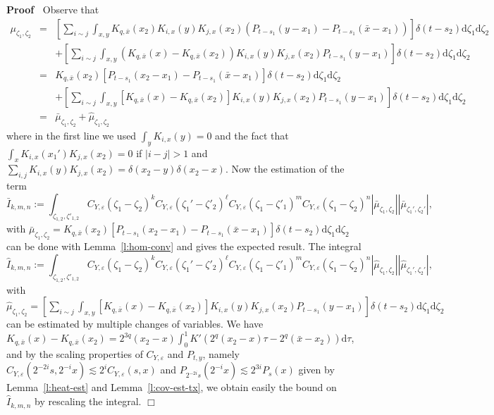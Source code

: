 \documentclass[a4paper,11pt]{article}
\newcommand{\assign}{:=}
\newcommand{\mathd}{\mathrm{d}}
\newenvironment{proof}{\noindent\textbf{Proof\ }}{\hspace*{\fill}$\Box$\medskip}
\begin{document}
\begin{proof}
  Observe that
  \begin{eqnarray*}
    \mu_{\zeta_1, \zeta_2} & = & [\sum_{i \sim j} \int_{x, y} K_{q, \bar{x}}
    (x_2) K_{i, x} (y) K_{j, x} (x_2) (P_{t - s_1} (y - x_1) - P_{t - s_1}
    (\bar{x} - x_1))] \delta (t - s_2) \mathd \zeta_1 \mathd \zeta_2\\
    &  & + [\sum_{i \sim j} \int_{x, y} (K_{q, \bar{x}} (x) - K_{q, \bar{x}}
    (x_2)) K_{i, x} (y) K_{j, x} (x_2) P_{t - s_1} (y - x_1)] \delta (t - s_2)
    \mathd \zeta_1 \mathd \zeta_2\\
    & = & K_{q, \bar{x}} (x_2) [P_{t - s_1} (x_2 - x_1) - P_{t - s_1}
    (\bar{x} - x_1)] \delta (t - s_2) \mathd \zeta_1 \mathd \zeta_2\\
    &  & + [\sum_{i \sim j} \int_{x, y} [K_{q, \bar{x}} (x) - K_{q, \bar{x}}
    (x_2)] K_{i, x} (y) K_{j, x} (x_2) P_{t - s_1} (y - x_1)] \delta (t - s_2)
    \mathd \zeta_1 \mathd \zeta_2\\
    & = & \bar{\mu}_{\zeta_1, \zeta_2} + \hat{\mu}_{\zeta_1, \zeta_2}
  \end{eqnarray*}
  where in the first line we used $\int_y K_{i, x} (y) = 0$ and the fact that
  $\int_x K_{i, x} (x_1') K_{j, x} (x_2) = 0$ if $| i - j | > 1$ and $\sum_{i,
  j} K_{i, x} (y) K_{j, x} (x_2) = \delta (x_2 - y) \delta (x_2 - x)$. Now the
  estimation of the term
  \[ \bar{I}_{k, m, n} \assign \int_{\zeta_{1, 2}, \zeta'_{1, 2}} C_{Y,
     \varepsilon} (\zeta_1 - \zeta_2)^k C_{Y, \varepsilon} (\zeta_1' -
     \zeta'_2)^{\ell} C_{Y, \varepsilon} (\zeta_1 - \zeta'_1)^m C_{Y,
     \varepsilon} (\zeta_1 - \zeta_2)^n | \bar{\mu}_{\zeta_1, \zeta_2} | |
     \bar{\mu}_{\zeta_1', \zeta_2'} |, \]
  with $\bar{\mu}_{\zeta_1, \zeta_2} = K_{q, \bar{x}} (x_2) [P_{t - s_1} (x_2
  - x_1) - P_{t - s_1} (\bar{x} - x_1)] \delta (t - s_2) \mathd \zeta_1 \mathd
  \zeta_2$ can be done with Lemma~\ref{l:hom-conv} and gives the expected
  result. The integral
  \[ \hat{I}_{k, m, n} \assign \int_{\zeta_{1, 2}, \zeta'_{1, 2}} C_{Y,
     \varepsilon} (\zeta_1 - \zeta_2)^k C_{Y, \varepsilon} (\zeta_1' -
     \zeta'_2)^{\ell} C_{Y, \varepsilon} (\zeta_1 - \zeta'_1)^m C_{Y,
     \varepsilon} (\zeta_1 - \zeta_2)^n | \hat{\mu}_{\zeta_1, \zeta_2} | |
     \hat{\mu}_{\zeta_1', \zeta_2'} |, \]
  with $\hat{\mu}_{\zeta_1, \zeta_2} = [\sum_{i \sim j} \int_{x, y} [K_{q,
  \bar{x}} (x) - K_{q, \bar{x}} (x_2)] K_{i, x} (y) K_{j, x} (x_2) P_{t - s_1}
  (y - x_1)] \delta (t - s_2) \mathd \zeta_1 \mathd \zeta_2$ can be estimated
  by multiple changes of variables. We have $K_{q, \bar{x}} (x) - K_{q,
  \bar{x}} (x_2) = 2^{3 q} (x_2 - x) \int_0^1 K' (2^q (x_2 - x) \tau - 2^q
  (\bar{x} - x_2)) \mathd \tau$, and by the scaling properties of $C_{Y,
  \varepsilon}$ and $P_{t, y}$, namely $C_{Y, \varepsilon} (2^{- 2 i} s, 2^{-
  i} x) \lesssim 2^i C_{Y, \varepsilon} (s, x)$ and $P_{2^{- 2 i} s} (2^{- i}
  x) \lesssim 2^{3 i} P_s (x)$ given by Lemma~\ref{l:heat-est} and
  Lemma~\ref{l:cov-est-tx}, we obtain easily the bound on $\hat{I}_{k, m, n}$
  by rescaling the integral.
\end{proof}
\end{document}
